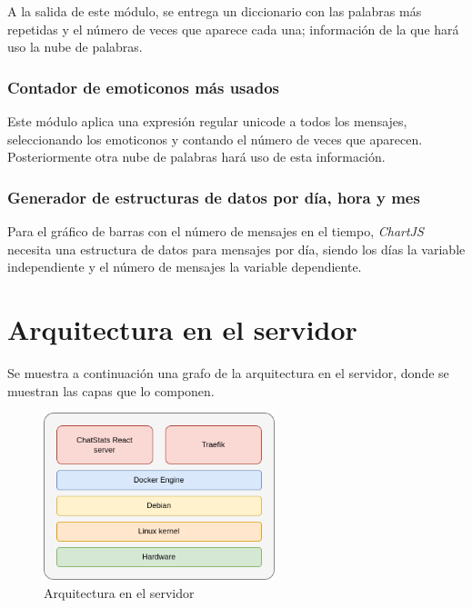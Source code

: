 A la salida de este módulo, se entrega un diccionario con las palabras más repetidas y el número de veces que aparece cada una; información de la que hará uso la nube de palabras.






\subsubsection{Contador de emoticonos más usados}

Este módulo aplica una expresión regular unicode a todos los mensajes, seleccionando los emoticonos y contando el número de veces que aparecen. Posteriormente otra nube de palabras hará uso de esta información.

\subsubsection{Generador de estructuras de datos por día, hora y mes}

Para el gráfico de barras con el número de mensajes en el tiempo, \textit{ChartJS} necesita una estructura de datos para mensajes por día, siendo los días la variable independiente y el número de mensajes la variable dependiente.


\section{Arquitectura en el servidor}

Se muestra a continuación una grafo de la arquitectura en el servidor, donde se muestran las capas que lo componen.

\begin{figure}[H]
	\centering
	\includegraphics[width=0.6\textwidth]{img/server.png}
	\caption{Arquitectura en el servidor}
	\label{fig:chap4:architecture_server}
\end{figure}

